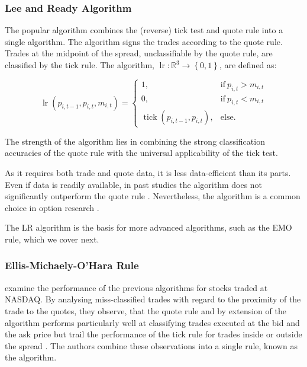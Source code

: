 \subsubsection{Lee and Ready Algorithm}\label{sec:lee-and-ready-algorithm}

The popular  algorithm \autocite[][745]{leeInferringTradeDirection1991} combines the (reverse) tick test and quote rule into a single algorithm. The algorithm signs the trades according to the quote rule. Trades at the midpoint of the spread, unclassifiable by the quote rule, are classified by the tick rule. The  algorithm, $\operatorname{lr} \colon \mathbb{R}^3 \to \left\{0,1\right\}$, are defined as:

\begin{equation}
  \operatorname{lr}(p_{i,t-1}, p_{i,t}, m_{i,t})=
  \begin{cases}
    1,                                       & \text{if}\ p_{i, t} > m_{i, t} \\
    0,                                       & \text{if}\ p_{i, t} < m_{i, t} \\
    \operatorname{tick}(p_{i,t-1}, p_{i,t}), & \text{else}.
  \end{cases}
\end{equation}

The strength of the algorithm lies in combining the strong classification accuracies of the quote rule with the universal applicability of the tick test.

As it requires both trade and quote data, it is less data-efficient than its parts. Even if data is readily available, in past studies the algorithm does not significantly outperform the quote rule \autocites[][30--32]{grauerOptionTradeClassification2022}[][886]{savickasInferringDirectionOption2003}.  Nevertheless, the algorithm is a common choice in option research \autocite[cp.][453]{easleyOptionVolumeStock1998}.

The \gls{LR} algorithm is the basis for more advanced algorithms, such as the \gls{EMO} rule, which we cover next.

\subsubsection{Ellis-Michaely-O'Hara
  Rule}\label{sec:ellis-michaely-ohara-rule}

\textcite[][536]{ellisAccuracyTradeClassification2000} examine the performance of the previous algorithms for stocks traded at NASDAQ. By analysing miss-classified trades with regard to the proximity of the trade to the quotes, they observe, that the quote rule and by extension of the  algorithm performs particularly well at classifying trades executed at the bid and the ask price but trail the performance of the tick rule for trades inside or outside the spread \autocite[][535--536]{ellisAccuracyTradeClassification2000}. The authors combine these observations into a single rule, known as the  algorithm.


